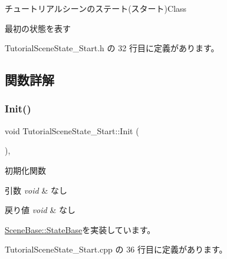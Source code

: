 チュートリアルシーンのステート(スタート)Class

最初の状態を表す 

 Tutorial\+Scene\+State\+\_\+\+Start.\+h の 32 行目に定義があります。



\subsection{関数詳解}
\mbox{\label{class_tutorial_scene_state___start_acd4cd7e4efeebffa9616d7ca31c7b1c0}} 
\subsubsection{\texorpdfstring{Init()}{Init()}}
{\footnotesize\ttfamily void Tutorial\+Scene\+State\+\_\+\+Start\+::\+Init (\begin{DoxyParamCaption}{ }\end{DoxyParamCaption})\hspace{0.3cm}{\ttfamily [override]}, {\ttfamily [virtual]}}



初期化関数 


\begin{DoxyParams}{引数}
{\em void} & なし \\
\hline
\end{DoxyParams}

\begin{DoxyRetVals}{戻り値}
{\em void} & なし \\
\hline
\end{DoxyRetVals}


\mbox{\hyperlink{class_scene_base_1_1_state_base_a33350231b039a2178c19beac0211c5b8}{Scene\+Base\+::\+State\+Base}}を実装しています。



 Tutorial\+Scene\+State\+\_\+\+Start.\+cpp の 36 行目に定義があります。

